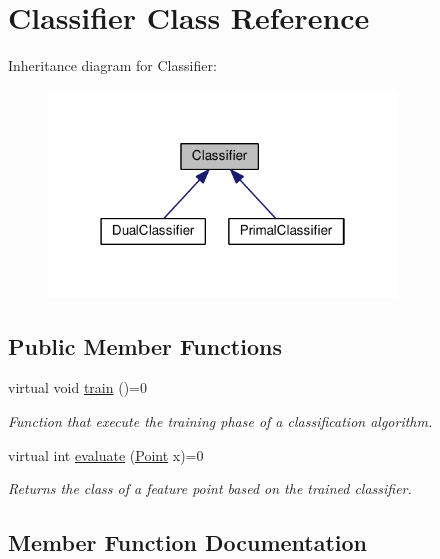 \hypertarget{class_classifier}{}\section{Classifier Class Reference}
\label{class_classifier}


Inheritance diagram for Classifier\+:\nopagebreak
\begin{figure}[H]
\begin{center}
\leavevmode
\includegraphics[width=262pt]{class_classifier__inherit__graph}
\end{center}
\end{figure}
\subsection*{Public Member Functions}
\begin{DoxyCompactItemize}
\item 
virtual void \hyperlink{class_classifier_a4e2f077e6f1dce1ef0376a02b60e7c21}{train} ()=0
\begin{DoxyCompactList}\small\item\em Function that execute the training phase of a classification algorithm. \end{DoxyCompactList}\item 
virtual int \hyperlink{class_classifier_a3934f8c7f64aa65bade43a179ea1fc46}{evaluate} (\hyperlink{class_point}{Point} x)=0
\begin{DoxyCompactList}\small\item\em Returns the class of a feature point based on the trained classifier. \end{DoxyCompactList}\end{DoxyCompactItemize}


\subsection{Member Function Documentation}
\mbox{\label{class_classifier_a3934f8c7f64aa65bade43a179ea1fc46}} 
